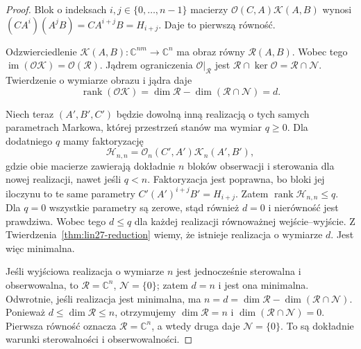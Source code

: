 \begin{proof}
Blok o indeksach
\(i,j\in\{0,\ldots,n-1\}\)
macierzy
\(\mathcal O(C,A)\mathcal K(A,B)\)
wynosi
\((CA^i)(A^jB)=CA^{i+j}B=H_{i+j}\).
Daje to pierwszą równość.

Odzwierciedlenie
\(\mathcal K(A,B)\colon
 \mathbb C^{nm}\to\mathbb C^n\)
ma obraz równy
\(\mathcal R(A,B)\).
Wobec tego
\(\operatorname{im}(
  \mathcal O\mathcal K)
 =\mathcal O(\mathcal R)\).
Jądrem ograniczenia
\(\mathcal O|_{\mathcal R}\)
jest
\(\mathcal R\cap\ker\mathcal O
 =\mathcal R\cap\mathcal N\).
Twierdzenie o wymiarze
obrazu i jądra daje
\[
 \operatorname{rank}(\mathcal O\mathcal K)
 =\dim\mathcal R
  -\dim(\mathcal R\cap\mathcal N)
 =d.
\]

Niech teraz \((A',B',C')\)
będzie dowolną inną realizacją
o tych samych parametrach
Markowa, której przestrzeń
stanów ma wymiar \(q\ge0\).
Dla dodatniego \(q\)
mamy faktoryzację
\[
 \mathcal H_{n,n}
  =\mathcal O_n(C',A')
     \mathcal K_n(A',B'),
\]
gdzie obie macierze
zawierają dokładnie
\(n\) bloków
obserwacji i sterowania
dla nowej realizacji,
nawet jeśli \(q<n\).
Faktoryzacja jest poprawna,
bo bloki jej iloczynu
to te same parametry
\(C'(A')^{i+j}B'=H_{i+j}\).
Zatem
\(\operatorname{rank}\mathcal H_{n,n}
 \le q\).
Dla \(q=0\)
wszystkie parametry są zerowe,
stąd również \(d=0\)
i nierówność jest prawdziwa.
Wobec tego \(d\le q\)
dla każdej realizacji
równoważnej wejście--wyjście.
Z
Twierdzenia~\ref{thm:lin27-reduction}
wiemy, że istnieje
realizacja o wymiarze \(d\).
Jest więc minimalna.

Jeśli wyjściowa realizacja
o wymiarze \(n\)
jest jednocześnie
sterowalna i obserwowalna,
to \(\mathcal R=\mathbb C^n\),
\(\mathcal N=\{0\}\);
zatem \(d=n\)
i jest ona minimalna.
Odwrotnie, jeśli realizacja
jest minimalna, ma
\(n=d=\dim\mathcal R
 -\dim(\mathcal R\cap\mathcal N)\).
Ponieważ
\(d\le\dim\mathcal R\le n\),
otrzymujemy
\(\dim\mathcal R=n\)
i \(\dim(\mathcal R\cap\mathcal N)=0\).
Pierwsza równość oznacza
\(\mathcal R=\mathbb C^n\),
a wtedy druga daje
\(\mathcal N=\{0\}\).
To są dokładnie
warunki sterowalności
i obserwowalności.
\end{proof}

